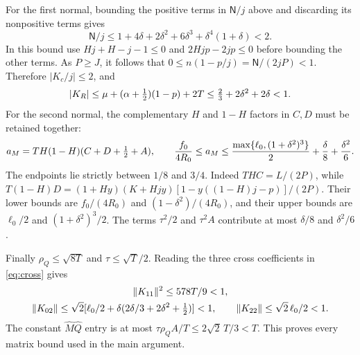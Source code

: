For the first normal, bounding the positive terms in $\mathsf N/j$ above
and discarding its nonpositive terms gives
\[
 \mathsf N/j\leq1+4\delta+2\delta^2+6\delta^3+
                       \delta^4(1+\delta)<2.
\]
In this bound use $Hj+H-j-1\leq0$ and
$2Hjp-2jp\leq0$ before bounding the other terms.
As $P\geq J$, it follows that
$0\leq n(1-p/j)=\mathsf N/(2jP)<1$.
Therefore $|K_c/j|\leq2$, and
\[
 |K_R|\leq \mu+(\alpha+\tfrac12)(1-p)+2T
 \leq\tfrac23+2\delta^2+2\delta<1.
\]
For the second normal, the complementary $H$ and $1-H$ factors in $C,D$
must be retained together:
\[
 a_M=TH(1-H)(C+D+\tfrac12+A),\qquad
 \frac{f_0}{4R_0}\leq a_M
 \leq\frac{\max\{\ell_0,(1+\delta^2)^3\}}2+\frac{\delta}{8}
                              +\frac{\delta^2}{6}.
\]
The endpoints lie strictly between $1/8$ and $3/4$.
Indeed $THC=L/(2P)$, while
$T(1-H)D=(1+Hy)(K+Hjy)[1-y((1-H)j-p)]/(2P)$.
Their lower bounds are $f_0/(4R_0)$ and
$(1-\delta^2)/(4R_0)$, and their upper bounds are
$\ell_0/2$ and $(1+\delta^2)^3/2$. The terms $\tau^2/2$ and $\tau^2 A$
contribute at most $\delta/8$ and $\delta^2/6$.

Finally $\rho_Q\leq\sqrt{8T}$ and $\tau\leq\sqrt T/2$.
Reading the three cross coefficients in \eqref{eq:cross} gives
\begin{gather*}
 \|K_{11}\|^2\leq578T/9<1,\\
 \|K_{02}\|\leq\sqrt2[\ell_0/2+
                  \delta(2\delta/3+2\delta^2+\tfrac12)]<1,\qquad
 \|K_{22}\|\leq\sqrt2\,\ell_0/2<1 .
\end{gather*}
The constant $\widehat M\widehat Q$ entry is at most
$\tau\rho_QA/T\leq2\sqrt2\,T/3<T$.
This proves every matrix bound used in the main argument.

